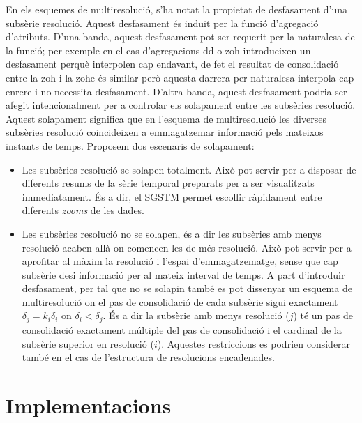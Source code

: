 En els esquemes de multiresolució, s'ha notat la propietat de
desfasament d'una subsèrie resolució. Aquest desfasament és induït per
la funció d'agregació d'atributs. D'una banda, aquest desfasament pot
ser requerit per la naturalesa de la funció; per exemple en el cas
d'agregacions \gls{dd} o \gls{zoh} introdueixen un desfasament perquè
interpolen cap endavant, de fet el resultat de consolidació entre la
\gls{zoh} i la \gls{zohe} és similar però aquesta darrera per
naturalesa interpola cap enrere i no necessita desfasament.  D'altra
banda, aquest desfasament podria ser afegit intencionalment per a
controlar els solapament entre les subsèries resolució.  Aquest
solapament significa que en l'esquema de multiresolució les diverses
subsèries resolució coincideixen a emmagatzemar informació pels
mateixos instants de temps. Proposem dos escenaris de solapament:
\begin{itemize}

\item Les subsèries resolució se solapen totalment. Això pot servir
  per a disposar de diferents resums de la sèrie temporal preparats
  per a ser visualitzats immediatament. És a dir, el \gls{SGSTM}
  permet escollir ràpidament entre diferents \emph{zooms} de les
  dades.

\item Les subsèries resolució no se solapen, és a dir les subsèries
  amb menys resolució acaben allà on comencen les de més
  resolució. Això pot servir per a aprofitar al màxim la resolució i
  l'espai d'emmagatzematge, sense que cap subsèrie desi informació per
  al mateix interval de temps. A part d'introduir desfasament, per tal
  que no se solapin també es pot dissenyar un esquema de
  multiresolució on el pas de consolidació de cada subsèrie sigui
  exactament $\delta_j = k_i\delta_i$ on $\delta_i<\delta_j$. És a dir
  la subsèrie amb menys resolució ($j$) té un pas de consolidació
  exactament múltiple del pas de consolidació i el cardinal de la
  subsèrie superior en resolució ($i$). Aquestes restriccions es
  podrien considerar també en el cas de l'estructura de resolucions
  encadenades.
\end{itemize}











\section{Implementacions}


